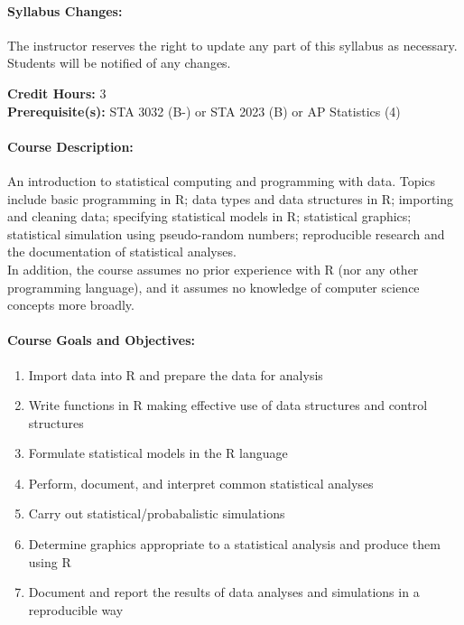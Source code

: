 \documentclass[11pt]{article}
\begin{document}
\paragraph{Syllabus Changes:}
The instructor reserves the right to update any part of this syllabus as necessary. Students will be notified of any changes.\\

\pagebreak

\textbf{Credit Hours:} 3\\

\textbf{Prerequisite(s):} STA 3032 (B-) or STA 2023 (B) or AP Statistics (4)

\paragraph{Course Description:}
An introduction to statistical computing and programming with data. Topics include basic programming in R; data types and data structures in R; importing and cleaning data; specifying statistical models in R; statistical graphics; statistical simulation using pseudo-random numbers; reproducible research and the documentation of statistical analyses. \\

In addition, the course assumes no prior experience with R (nor any other programming language), and it assumes no knowledge of computer science concepts more broadly.

\paragraph{Course Goals and Objectives:}
\begin{enumerate}
	\item Import data into R and prepare the data for analysis
	\item Write functions in R making effective use of data structures and control structures
	\item Formulate statistical models in the R language
	\item Perform, document, and interpret common statistical analyses
	\item Carry out statistical/probabalistic simulations
	\item Determine graphics appropriate to a statistical analysis and produce them using R
	\item Document and report the results of data analyses and simulations in a reproducible way
\end{enumerate}
\end{document}
